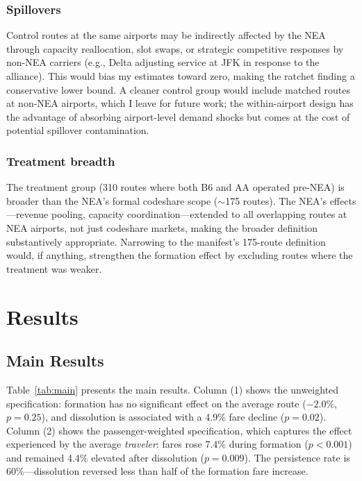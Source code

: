 \documentclass[12pt]{article}
\begin{document}
\subsubsection*{Spillovers} Control routes at the same airports may be indirectly affected by the NEA through capacity reallocation, slot swaps, or strategic competitive responses by non-NEA carriers (e.g., Delta adjusting service at JFK in response to the alliance). This would bias my estimates toward zero, making the ratchet finding a conservative lower bound. A cleaner control group would include matched routes at non-NEA airports, which I leave for future work; the within-airport design has the advantage of absorbing airport-level demand shocks but comes at the cost of potential spillover contamination.

\subsubsection*{Treatment breadth} The treatment group (310 routes where both B6 and AA operated pre-NEA) is broader than the NEA's formal codeshare scope ($\sim$175 routes). The NEA's effects---revenue pooling, capacity coordination---extended to all overlapping routes at NEA airports, not just codeshare markets, making the broader definition substantively appropriate. Narrowing to the manifest's 175-route definition would, if anything, strengthen the formation effect by excluding routes where the treatment was weaker.


\section{Results}

\subsection{Main Results}



Table~\ref{tab:main} presents the main results. Column (1) shows the unweighted specification: formation has no significant effect on the average route ($-2.0\%$, $p = 0.25$), and dissolution is associated with a 4.9\% fare decline ($p = 0.02$). Column (2) shows the passenger-weighted specification, which captures the effect experienced by the average \textit{traveler}: fares rose 7.4\% during formation ($p < 0.001$) and remained 4.4\% elevated after dissolution ($p = 0.009$). The persistence rate is 60\%---dissolution reversed less than half of the formation fare increase.
\end{document}

